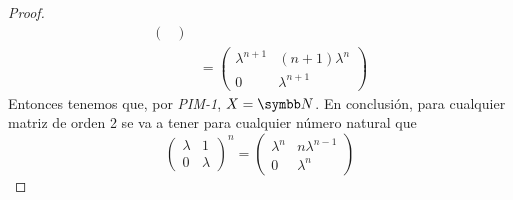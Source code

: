 \begin{proof}
\[\begin{aligned}
\begin{pmatrix}
                \end{pmatrix}
                \\
                &=
                \begin{pmatrix}
                    \lambda^{n + 1} & (n + 1)\lambda^{n} \\
                    0 & \lambda^{n + 1}
                \end{pmatrix}
            \end{aligned}
        \]
        Entonces tenemos que, por \emph{PIM-1}, \(X = \realN\). En conclusión, para cualquier matriz de orden 2 se va a tener para 
        cualquier número natural que 
        \[
            \begin{pmatrix}
                \lambda & 1 \\
                0 & \lambda
            \end{pmatrix} ^ {n}
            =
            \begin{pmatrix}
                \lambda^{n} & n\lambda^{n - 1} \\
                0 & \lambda^{n}
            \end{pmatrix}
        \]
    \end{proof}
